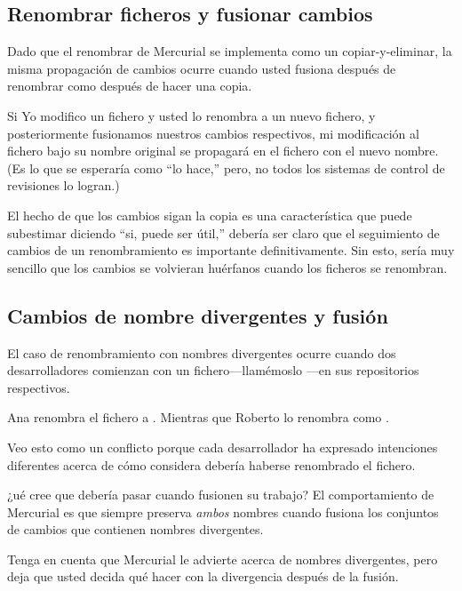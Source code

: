\subsection{Renombrar ficheros y fusionar cambios}

Dado que el renombrar de Mercurial se implementa como un
copiar-y-eliminar, la misma propagación de cambios ocurre cuando usted
fusiona después de renombrar como después de hacer una copia.

Si Yo modifico un fichero y usted lo renombra a un nuevo fichero, y
posteriormente fusionamos nuestros cambios respectivos, mi
modificación al fichero bajo su nombre original se propagará en el
fichero con el nuevo nombre. (Es lo que se esperaría como ``lo hace,''
pero, no todos los sistemas de control de revisiones lo logran.)

El hecho de que los cambios sigan la copia es una característica que
puede subestimar diciendo ``si, puede ser útil,'' debería ser claro
que el seguimiento de cambios de un renombramiento es importante
definitivamente.  Sin esto, sería muy sencillo que los cambios se
volvieran huérfanos cuando los ficheros se renombran.

\subsection{Cambios de nombre divergentes y fusión}

El caso de renombramiento con nombres divergentes ocurre cuando dos
desarrolladores comienzan  con un fichero---llamémoslo
---en sus repositorios respectivos.

Ana renombra el fichero a .
Mientras que Roberto lo renombra como .

Veo esto como un conflicto porque cada desarrollador ha expresado
intenciones diferentes acerca de cómo considera debería haberse
renombrado el fichero.

¿ué cree que debería pasar cuando fusionen su trabajo?
El comportamiento de Mercurial es que siempre preserva \emph{ambos}
nombres cuando fusiona  los conjuntos de cambios que contienen nombres
divergentes.

Tenga en cuenta que Mercurial le advierte acerca de nombres
divergentes, pero deja que usted decida qué hacer con la divergencia
después de la fusión.

